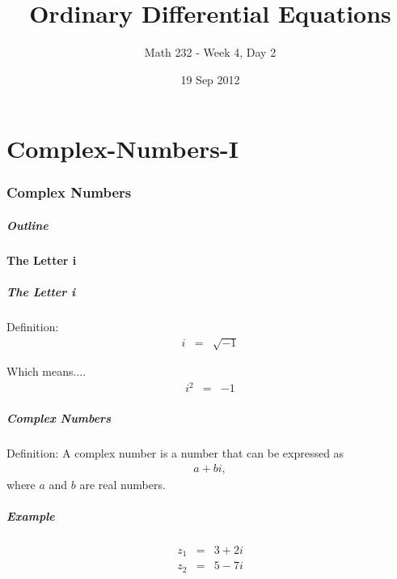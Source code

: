 \part{Complex-Numbers-I}
\section{Complex Numbers}

\title{Ordinary Differential Equations}
\subtitle{Math 232 - Week 4, Day 2}
\date{19 Sep 2012}

\begin{frame}
  \titlepage
\end{frame}

\begin{frame}
  \frametitle{Outline}
\end{frame}


\subsection{The Letter i}


\begin{frame}
  \frametitle{The Letter i}

  Definition: 
  \begin{eqnarray*}
    i & = & \sqrt{-1} 
  \end{eqnarray*}

  Which means....
  \begin{eqnarray*}
    i^2 & = & -1
  \end{eqnarray*}

\end{frame}


\begin{frame}
  \frametitle{Complex Numbers}

  Definition: A complex number is a  number that can be expressed as
  \begin{eqnarray*}
    a + bi,
  \end{eqnarray*}
  where $a$ and $b$ are real numbers.

\end{frame}



\begin{frame}
  \frametitle{Example}

  \begin{eqnarray*}
    z_1 & = & 3 + 2i \\
    z_2 & = & 5 - 7i
  \end{eqnarray*}

\end{frame}

